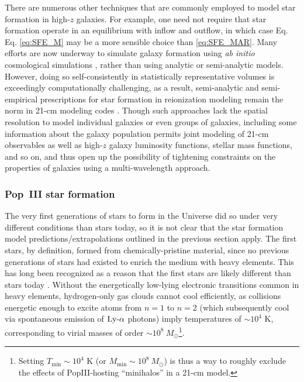 There are numerous other techniques that are commonly employed to model star formation in high-$z$ galaxies. For example, one need not require that star formation operate in an equilibrium with inflow and outflow, in which case Eq. Eq. \ref{eq:SFE_M} may be a more sensible choice than \ref{eq:SFE_MAR}. Many efforts are now underway to simulate galaxy formation using \textit{ab initio} cosmological simulations \cite{OShea2015,Gnedin2014}, rather than using analytic or semi-analytic models. However, doing so self-consistently in statistically representative volumes is exceedingly computationally challenging, as a result, semi-analytic and semi-empirical prescriptions for star formation in reionization modeling remain the norm in 21-cm modeling codes \cite{Mirocha2017,Park2019,Mutch2016}. Though such approaches lack the spatial resolution to model individual galaxies or even groups of galaxies, including some information about the galaxy population permits joint modeling of 21-cm observables as well as high-$z$ galaxy luminosity functions, stellar mass functions, and so on, and thus open up the possibility of tightening constraints on the properties of galaxies using a multi-wavelength approach.

\subsubsection{Pop~III star formation} \label{sec:popIII}
The very first generations of stars to form in the Universe did so under very different conditions than stars today, so it is not clear that the star formation model predictions/extrapolations outlined in the previous section apply. The first stars, by definition, formed from chemically-pristine material, since no previous generations of stars had existed to enrich the medium with heavy elements. This has long been recognized as a reason that the first stars are likely different than stars today \cite{Abel2000,Bromm1999}. Without the energetically low-lying electronic transitions common in heavy elements, hydrogen-only gas clouds cannot cool efficiently, as collisions energetic enough to excite atoms from $n=1$ to $n=2$ (which subsequently cool via spontaneous emission of $\text{Ly-}\alpha$ photons) imply temperatures of $\sim 10^4$ K, corresponding to virial masses of order $\sim 10^8 \ M_{\odot}$\footnote{Setting $T_{\min} \sim 10^4$ K (or $M_{\min} \sim 10^8 \ M_{\odot}$) is thus a way to roughly exclude the effects of PopIII-hosting ``minihalos'' in a 21-cm model.}. 

